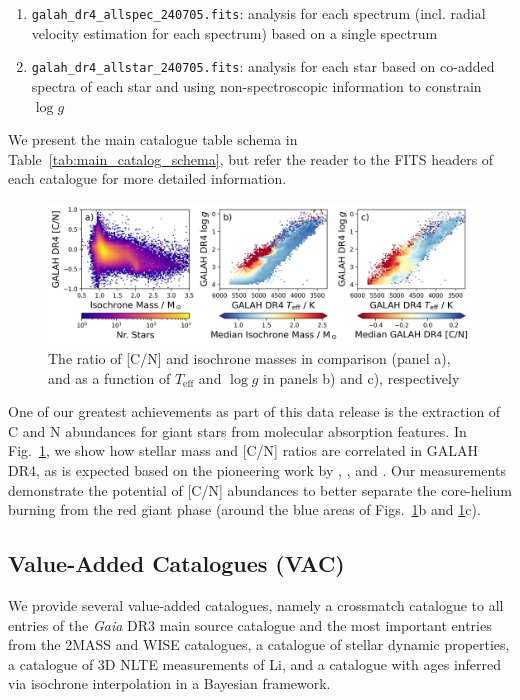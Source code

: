 \documentclass[
  journal=pasa,
  manuscript=research-paper, %
  year=2024,
  volume=37
]{cup-journal}
\newcommand{\Teff}{$T_\mathrm{eff}$\xspace}
\newcommand{\logg}{$\log g$\xspace}
\newcommand{\Gaia}{\textit{Gaia}\xspace}
\begin{document}
\begin{enumerate}
   \item \texttt{galah\_dr4\_allspec\_240705.fits}: analysis for each spectrum (incl. radial velocity estimation for each spectrum) based on a single spectrum
   \item \texttt{galah\_dr4\_allstar\_240705.fits}: analysis for each star based on co-added spectra of each star and using non-spectroscopic information to constrain \logg
\end{enumerate}

We present the main catalogue table schema in Table~\ref{tab:main_catalog_schema}, but refer the reader to the FITS headers of each catalogue for more detailed information.


\begin{figure}[ht]
    \centering
    \includegraphics[width=\textwidth]{figures/cn_mass.png}
    \caption{The ratio of [C/N] and isochrone masses in comparison (panel a), and as a function of \Teff and \logg in panels b) and c), respectively}
    \label{fig:cn_mass}
\end{figure}

One of our greatest achievements as part of this data release is the extraction of C and N abundances for giant stars from molecular absorption features. In Fig.~\ref{fig:cn_mass}, we show how stellar mass and [C/N] ratios are correlated in GALAH DR4, as is expected based on the pioneering work by \citet{Masseron2015}, \citet{Martig2016}, and \citet{Ness2016}. Our measurements demonstrate the potential of [C/N] abundances to better separate the core-helium burning from the red giant phase (around the blue areas of Figs.~\ref{fig:cn_mass}b and \ref{fig:cn_mass}c).

\subsection{Value-Added Catalogues (VAC)} \label{sec:vacs}

We provide several value-added catalogues, namely a crossmatch catalogue to all entries of the \Gaia DR3 main source catalogue and the most important entries from the 2MASS and WISE catalogues, a catalogue of stellar dynamic properties, a catalogue of 3D NLTE measurements of Li, and a catalogue with ages inferred via isochrone interpolation in a Bayesian framework.
\end{document}

